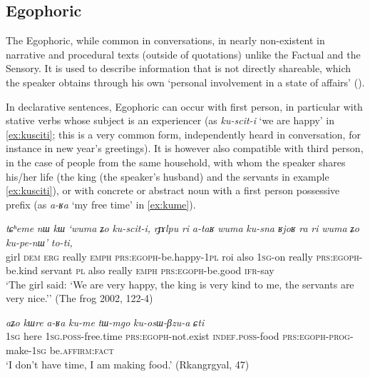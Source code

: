 \documentclass[11pt]{article}
\newcommand{\ipa}[1]{{\phon\textit{#1}}} %
\newcommand{\factual}[1]{\textsc{:fact}}
\begin{document}
 

\subsection{Egophoric} \label{sec:egophoric}
The Egophoric, while common in conversations, in nearly non-existent in narrative and procedural texts (outside of quotations) unlike the Factual and the Sensory. It is used to describe information that is not directly shareable, which the speaker obtains through his own `personal involvement in a state of affairs' (\citealt{floyd16egophoricity}). 

In declarative sentences, Egophoric can occur with first person, in particular with stative verbs whose subject is an experiencer (as \ipa{ku-scit-i} `we are happy' in \ref{ex:kusciti}; this is a very common form, independently heard in conversation, for instance in new year's greetings). It is however also compatible with third person, in the case of people from the same household, with whom the speaker shares his/her life (the king (the speaker's husband) and the servants in example \ref{ex:kusciti}), or with concrete or abstract noun with a first person possessive prefix (as \ipa{a-ʁa} `my free time' in \ref{ex:kume}).

\begin{exe}
\ex \label{ex:kusciti}
\gll
\ipa{tɕʰeme} 	\ipa{nɯ} 	\ipa{kɯ} 	\ipa{`wuma} 	\ipa{ʑo} 	\ipa{ku-scit-i,} \ipa{rɟɤlpu} 	\ipa{ri} 	\ipa{a-taʁ} 	\ipa{wuma} 	\ipa{ku-sna} \ipa{ʁjoʁ} 	\ipa{ra} 	\ipa{ri} 	\ipa{wuma} 	\ipa{ʑo} 	\ipa{ku-pe-nɯ'} \ipa{to-ti,} \\
girl \textsc{dem} \textsc{erg} really \textsc{emph} \textsc{prs:egoph}-be.happy-\textsc{1pl}  roi also \textsc{1sg}-on really \textsc{prs:egoph}-be.kind servant \textsc{pl} also really \textsc{emph}   \textsc{prs:egoph}-be.good \textsc{ifr}-say \\
\glt `The girl said: `We are very happy, the king is very kind to me, the servants are very nice.''
(The frog 2002, 122-4)
\end{exe}


\begin{exe}
\ex \label{ex:kume}
\gll 
\ipa{aʑo}  	\ipa{kɯre}  	\ipa{a-ʁa}  	\ipa{ku-me}  \ipa{tɯ-mgo} 	\ipa{ku-osɯ-βzu-a} 	\ipa{ɕti} 	  	\\
\textsc{1sg} here \textsc{1sg.poss}-free.time \textsc{prs:egoph}-not.exist \textsc{indef.poss}-food \textsc{prs:egoph}-\textsc{prog}-make-\textsc{1sg} be.\textsc{affirm}\factual{}  \\
\glt `I don't have time, I am making food.'  (Rkangrgyal, 47)
\end{exe}
\end{document}
